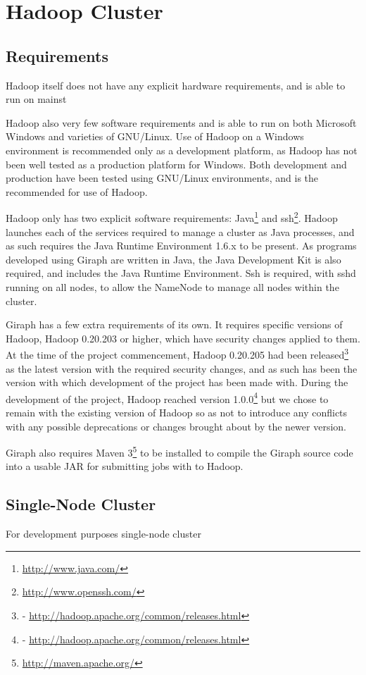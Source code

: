 \section{Hadoop Cluster}
\subsection{Requirements}
Hadoop itself does not have any explicit hardware requirements, and is able to run on mainst

Hadoop also very few software requirements and is able to run on both Microsoft Windows and varieties of GNU/Linux. Use of Hadoop on a Windows environment is recommended only as a development platform, as Hadoop has not been well tested as a production platform for Windows. Both development and production have been tested using GNU/Linux environments, and is the recommended for use of Hadoop.

Hadoop only has two explicit software requirements: Java\footnote{\url{http://www.java.com/}} and ssh\footnote{\url{http://www.openssh.com/}}. Hadoop launches each of the services required to manage a cluster as Java processes, and as such requires the Java Runtime Environment 1.6.x to be present. As programs developed using Giraph are written in Java, the Java Development Kit is also required, and includes the Java Runtime Environment. Ssh is required, with sshd running on all nodes, to allow the NameNode to manage all nodes within the cluster. 

Giraph has a few extra requirements of its own. It requires specific versions of Hadoop, Hadoop 0.20.203 or higher, which have security changes applied to them. At the time of the project commencement, Hadoop 0.20.205 had been released\footnote{\date{17th October 2011} - \url{http://hadoop.apache.org/common/releases.html}} as the latest version with the required security changes, and as such has been the version with which development of the project has been made with. During the development of the project, Hadoop reached version 1.0.0\footnote{\date{27th December 2011} - \url{http://hadoop.apache.org/common/releases.html}} but we chose to remain with the existing version of Hadoop so as not to introduce any conflicts with any possible deprecations or changes brought about by the newer version.

Giraph also requires Maven 3\footnote{\url{http://maven.apache.org/}} to be installed to compile the Giraph source code into a usable JAR for submitting jobs with to Hadoop.

\subsection{Single-Node Cluster}
For development purposes single-node cluster \cite{nollsingle}

